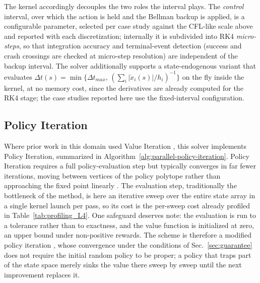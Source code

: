 \documentclass[journal ]{new-aiaa}
\begin{document}
The kernel accordingly decouples the two roles the interval plays.
The \emph{control} interval, over which the action is held and the
Bellman backup is applied, is a configurable parameter, selected per
case study against the CFL-like scale above and reported with each
discretization; internally it is subdivided into RK4
\emph{micro-steps}, so that integration accuracy and terminal-event
detection (success and crash crossings are checked at micro-step
resolution) are independent of the backup interval. The solver
additionally supports a state-endogenous variant that evaluates
$\Delta t(s) = \min\{\Delta t_{max},\, (\sum_i |\dot{x}_i(s)| /
h_i)^{-1}\}$ on the fly inside the kernel, at no memory cost, since
the derivatives are already computed for the RK4 stage; the case
studies reported here use the fixed-interval configuration.

\subsection{Policy Iteration}
Where prior work in this domain used Value Iteration \cite{Bunge2018}, this solver implements Policy Iteration, summarized in Algorithm~\ref{alg:parallel-policy-iteration}. Policy Iteration requires a full policy-evaluation step but typically converges in far fewer iterations, moving between vertices of the policy polytope rather than approaching the fixed point linearly \cite{Bertsekas2017}. The evaluation step, traditionally the bottleneck of the method, is here an iterative sweep over the entire state array in a single kernel launch per pass, so its cost is the per-sweep cost already profiled in Table~\ref{tab:profiling_L4}. One safeguard deserves note: the evaluation is run to a tolerance rather than to exactness, and the value function is initialized at zero, an upper bound under non-positive rewards. The scheme is therefore a modified policy iteration \cite{Bertsekas2017}, whose convergence under the conditions of Sec.~\ref{sec:guarantee} does not require the initial random policy to be proper; a policy that traps part of the state space merely sinks the value there sweep by sweep until the next improvement replaces it.
\end{document}
